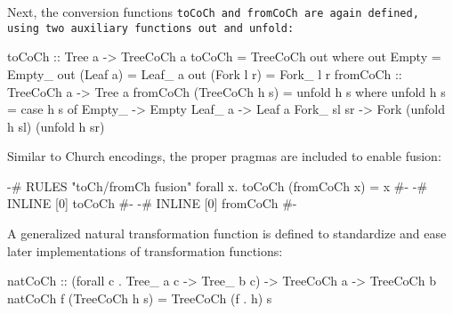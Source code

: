 Next, the conversion functions \tt{toCoCh} and \tt{fromCoCh} are again defined, using two auxiliary functions \tt{out} and \tt{unfold}:
\begin{code}
toCoCh :: Tree a -> TreeCoCh a
toCoCh = TreeCoCh out
  where out Empty = Empty_
        out (Leaf a) = Leaf_ a
        out (Fork l r) = Fork_ l r
fromCoCh :: TreeCoCh a -> Tree a
fromCoCh (TreeCoCh h s) = unfold h s
  where unfold h s = case h s of
          Empty_ -> Empty
          Leaf_ a -> Leaf a
          Fork_ sl sr -> Fork (unfold h sl) (unfold h sr)
\end{code}
Similar to Church encodings, the proper pragmas are included to enable fusion:
\begin{code}
{-# RULES "toCh/fromCh fusion" forall x. toCoCh (fromCoCh x) = x #-}
{-# INLINE [0] toCoCh #-}
{-# INLINE [0] fromCoCh #-}
\end{code}
A generalized natural transformation function is defined to standardize and ease later implementations of transformation functions:
\begin{code}
natCoCh :: (forall c . Tree_ a c -> Tree_ b c) -> TreeCoCh a -> TreeCoCh b
natCoCh f (TreeCoCh h s) = TreeCoCh (f . h) s
\end{code}
